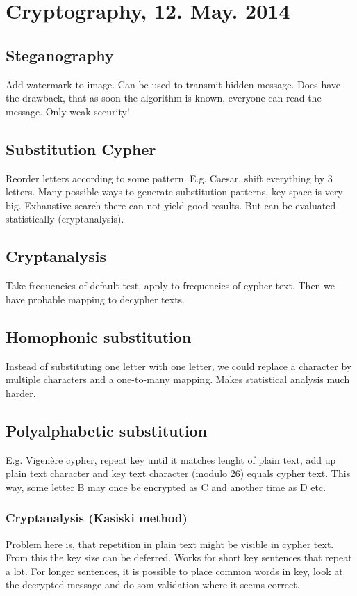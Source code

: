 \documentclass[11pt]{article}
\begin{document}
\section{Cryptography, 12. May. 2014}
\subsection{Steganography}
Add watermark to image. Can be used to transmit hidden message. Does have the drawback, that
as soon the algorithm is known, everyone can read the message. Only weak security!
\subsection{Substitution Cypher}
Reorder letters according to some pattern. E.g. Caesar, shift everything by 3 letters. 
Many possible ways to generate substitution patterns, key space is very big. Exhaustive 
search there can not yield good results. But can be evaluated statistically (cryptanalysis).

\subsection{Cryptanalysis}
Take frequencies of default test, apply to frequencies of cypher text. Then we have probable
mapping to decypher texts.

\subsection{Homophonic substitution}
Instead of substituting one letter with one letter, we could replace a character by multiple
characters and a one-to-many mapping. Makes statistical analysis much harder.
\subsection{Polyalphabetic substitution}
E.g. Vigenère cypher, repeat key until it matches lenght of plain text, add up plain text
character and key text character (modulo 26) equals cypher text. This way, some letter B
may once be encrypted as C and another time as D etc.

\subsubsection{Cryptanalysis (Kasiski method)}
Problem here is, that repetition in plain text might be visible in cypher text. From this
the key size can be deferred. Works for short key sentences that repeat a lot. For longer
sentences, it is possible to place common words in key, look at the decrypted message and do
som validation where it seems correct.
\end{document}
